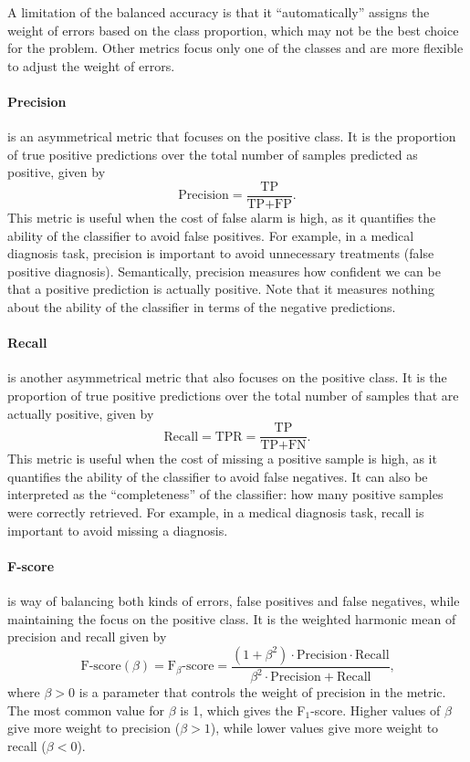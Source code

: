 A limitation of the balanced accuracy is that it ``automatically'' assigns the weight of
errors based on the class proportion, which may not be the best choice for the problem.
Other metrics focus only one of the classes and are more flexible to adjust the weight of
errors.

\paragraph{Precision} is an asymmetrical metric that focuses on the positive class.  It is
the proportion of true positive predictions over the total number of samples predicted as
positive, given by
\begin{equation*}
  \text{Precision} = \frac{\text{TP}}{\text{TP} + \text{FP}}\text{.}
\end{equation*}
This metric is useful when the cost of false alarm is high, as it quantifies the
ability of the classifier to avoid false positives.  For example, in a medical diagnosis
task, precision is important to avoid unnecessary treatments (false positive diagnosis).
Semantically, precision measures how confident we can be that a positive prediction is
actually positive.  Note that it measures nothing about the ability of the classifier in
terms of the negative predictions.

\paragraph{Recall} is another asymmetrical metric that also focuses on the positive class.
It is the proportion of true positive predictions over the total number of
samples that are actually positive, given by
\begin{equation*}
  \text{Recall} = \text{TPR} = \frac{\text{TP}}{\text{TP} + \text{FN}}\text{.}
\end{equation*}
This metric is useful when the cost of missing a positive sample is high, as it quantifies the
ability of the classifier to avoid false negatives.  It can also be interpreted as the
``completeness'' of the classifier: how many positive samples were correctly retrieved.
For example, in a medical diagnosis task, recall is important to avoid missing a
diagnosis.

\paragraph{F-score} is way of balancing both kinds of errors, false positives and false
negatives, while maintaining the focus on the positive class. It is the weighted harmonic
mean of precision and recall given by
\begin{equation*}
  \text{F-score}(\beta) = \text{F}_\beta\text{-score} =
    \frac%
      {(1 + \beta^2) \cdot \text{Precision} \cdot \text{Recall}}
      {\beta^2 \cdot \text{Precision} + \text{Recall}}\text{,}
\end{equation*}
where $\beta > 0$ is a parameter that controls the weight of precision in the metric.
The most common value for $\beta$ is 1, which gives the F$_1$-score.  Higher values of
$\beta$ give more weight to precision ($\beta > 1$), while lower values give more weight
to recall ($\beta < 0$).

